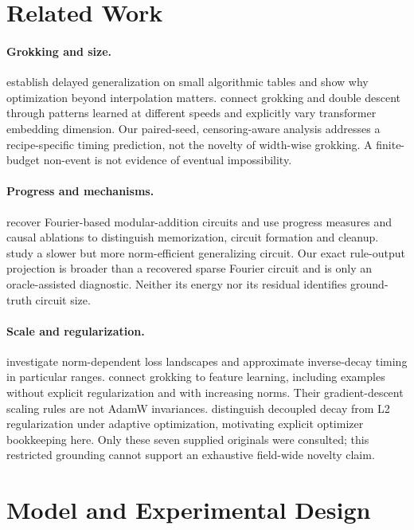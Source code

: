 \documentclass{article}
\begin{document}
\section{Related Work}
\paragraph{Grokking and size.}
\citet{power2022} establish delayed generalization on small algorithmic tables and show why optimization beyond interpolation matters. \citet{davies2023} connect grokking and double descent through patterns learned at different speeds and explicitly vary transformer embedding dimension. Our paired-seed, censoring-aware analysis addresses a recipe-specific timing prediction, not the novelty of width-wise grokking. A finite-budget non-event is not evidence of eventual impossibility.

\paragraph{Progress and mechanisms.}
\citet{nanda2023} recover Fourier-based modular-addition circuits and use progress measures and causal ablations to distinguish memorization, circuit formation and cleanup. \citet{varma2023} study a slower but more norm-efficient generalizing circuit. Our exact rule-output projection is broader than a recovered sparse Fourier circuit and is only an oracle-assisted diagnostic. Neither its energy nor its residual identifies ground-truth circuit size.

\paragraph{Scale and regularization.}
\citet{liu2023} investigate norm-dependent loss landscapes and approximate inverse-decay timing in particular ranges. \citet{kumar2024} connect grokking to feature learning, including examples without explicit regularization and with increasing norms. Their gradient-descent scaling rules are not AdamW invariances. \citet{loshchilov2019} distinguish decoupled decay from L2 regularization under adaptive optimization, motivating explicit optimizer bookkeeping here. Only these seven supplied originals were consulted; this restricted grounding cannot support an exhaustive field-wide novelty claim.

\section{Model and Experimental Design}
\end{document}
